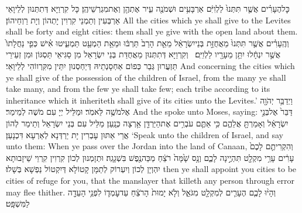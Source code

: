{כׇּל\maqqaf הֶעָרִ֗ים אֲשֶׁ֤ר תִּתְּנוּ֙ לַלְוִיִּ֔ם אַרְבָּעִ֥ים וּשְׁמֹנֶ֖ה עִ֑יר אֶתְהֶ֖ן וְאֶת\maqqaf מִגְרְשֵׁיהֶֽן׃}
{כָּל קִרְוַיָּא דְּתִתְּנוּן לְלֵיוָאֵי אַרְבְּעִין וְתַמְנֵי קִרְוִין יָתְהוֹן וְיָת רַוְחֵיהוֹן׃}
{All the cities which ye shall give to the Levites shall be forty and eight cities: them shall ye give with the open land about them.}{}
{וְהֶֽעָרִ֗ים אֲשֶׁ֤ר תִּתְּנוּ֙ מֵאֲחֻזַּ֣ת בְּנֵי\maqqaf יִשְׂרָאֵ֔ל מֵאֵ֤ת הָרַב֙ תַּרְבּ֔וּ וּמֵאֵ֥ת הַמְעַ֖ט תַּמְעִ֑יטוּ אִ֗ישׁ כְּפִ֤י נַחֲלָתוֹ֙ אֲשֶׁ֣ר יִנְחָ֔לוּ יִתֵּ֥ן מֵעָרָ֖יו לַלְוִיִּֽם׃ \petucha }
{וְקִרְוַיָּא דְּתִתְּנוּן מֵאֲחֻדַּת בְּנֵי יִשְׂרָאֵל מִן סַגִּיאֵי תַּסְגּוֹן וּמִן זְעֵירֵי תַּזְעֲרוּן גְּבַר כְּפוֹם אַחְסָנְתֵיהּ דְּיַחְסְנוּן יִתֵּין מִקִּרְווֹהִי לְלֵיוָאֵי׃}
{And concerning the cities which ye shall give of the possession of the children of Israel, from the many ye shall take many, and from the few ye shall take few; each tribe according to its inheritance which it inheriteth shall give of its cities unto the Levites.’}{}
{וַיְדַבֵּ֥ר יְהֹוָ֖ה אֶל\maqqaf מֹשֶׁ֥ה לֵּאמֹֽר׃}
{וּמַלֵּיל יְיָ עִם מֹשֶׁה לְמֵימַר׃}
{And the \lord\space spoke unto Moses, saying:}{}
{דַּבֵּר֙ אֶל\maqqaf בְּנֵ֣י יִשְׂרָאֵ֔ל וְאָמַרְתָּ֖ אֲלֵהֶ֑ם כִּ֥י אַתֶּ֛ם עֹבְרִ֥ים אֶת\maqqaf הַיַּרְדֵּ֖ן אַ֥רְצָה כְּנָֽעַן׃}
{מַלֵּיל עִם בְּנֵי יִשְׂרָאֵל וְתֵימַר לְהוֹן אֲרֵי אַתּוּן עָבְרִין יָת יַרְדְּנָא לְאַרְעָא דִּכְנָעַן׃}
{‘Speak unto the children of Israel, and say unto them: When ye pass over the Jordan into the land of Canaan,}{}
{וְהִקְרִיתֶ֤ם לָכֶם֙ עָרִ֔ים עָרֵ֥י מִקְלָ֖ט תִּהְיֶ֣ינָה לָכֶ֑ם וְנָ֥ס שָׁ֙מָּה֙ רֹצֵ֔חַ מַכֵּה\maqqaf נֶ֖פֶשׁ בִּשְׁגָגָֽה׃}
{וּתְזָמְנוּן לְכוֹן קִרְוִין קִרְוֵי שֵׁיזָבוּתָא יִהְוְיָן לְכוֹן וְיִעְרוֹק לְתַמָּן קָטוֹלָא דְּיִקְטוֹל נַפְשָׁא בְּשָׁלוּ׃}
{then ye shall appoint you cities to be cities of refuge for you, that the manslayer that killeth any person through error may flee thither.}{}
{וְהָי֨וּ לָכֶ֧ם הֶעָרִ֛ים לְמִקְלָ֖ט מִגֹּאֵ֑ל וְלֹ֤א יָמוּת֙ הָרֹצֵ֔חַ עַד\maqqaf עׇמְד֛וֹ לִפְנֵ֥י הָעֵדָ֖ה לַמִּשְׁפָּֽט׃}
